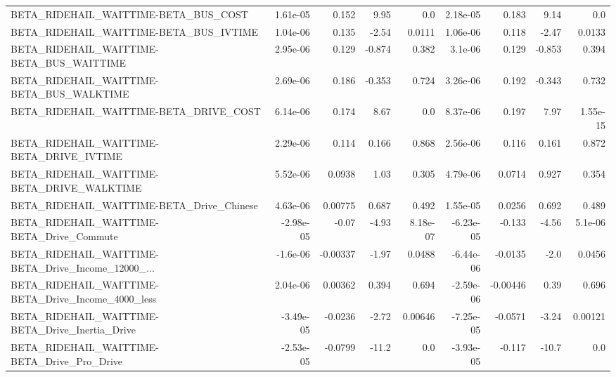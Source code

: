 \begin{tabular}{lrrrrrrrr}
BETA\_RIDEHAIL\_WAITTIME-BETA\_BUS\_COST               &    1.61e-05 &        0.152 &     9.95 &      0.0 &   2.18e-05 &       0.183 &         9.14 &           0.0 \\
BETA\_RIDEHAIL\_WAITTIME-BETA\_BUS\_IVTIME             &    1.04e-06 &        0.135 &    -2.54 &   0.0111 &   1.06e-06 &       0.118 &        -2.47 &        0.0133 \\
BETA\_RIDEHAIL\_WAITTIME-BETA\_BUS\_WAITTIME           &    2.95e-06 &        0.129 &   -0.874 &    0.382 &    3.1e-06 &       0.129 &       -0.853 &         0.394 \\
BETA\_RIDEHAIL\_WAITTIME-BETA\_BUS\_WALKTIME           &    2.69e-06 &        0.186 &   -0.353 &    0.724 &   3.26e-06 &       0.192 &       -0.343 &         0.732 \\
BETA\_RIDEHAIL\_WAITTIME-BETA\_DRIVE\_COST             &    6.14e-06 &        0.174 &     8.67 &      0.0 &   8.37e-06 &       0.197 &         7.97 &      1.55e-15 \\
BETA\_RIDEHAIL\_WAITTIME-BETA\_DRIVE\_IVTIME           &    2.29e-06 &        0.114 &    0.166 &    0.868 &   2.56e-06 &       0.116 &        0.161 &         0.872 \\
BETA\_RIDEHAIL\_WAITTIME-BETA\_DRIVE\_WALKTIME         &    5.52e-06 &       0.0938 &     1.03 &    0.305 &   4.79e-06 &      0.0714 &        0.927 &         0.354 \\
BETA\_RIDEHAIL\_WAITTIME-BETA\_Drive\_Chinese          &    4.63e-06 &      0.00775 &    0.687 &    0.492 &   1.55e-05 &      0.0256 &        0.692 &         0.489 \\
BETA\_RIDEHAIL\_WAITTIME-BETA\_Drive\_Commute          &   -2.98e-05 &        -0.07 &    -4.93 & 8.18e-07 &  -6.23e-05 &      -0.133 &        -4.56 &       5.1e-06 \\
BETA\_RIDEHAIL\_WAITTIME-BETA\_Drive\_Income\_12000\_... &    -1.6e-06 &     -0.00337 &    -1.97 &   0.0488 &  -6.44e-06 &     -0.0135 &         -2.0 &        0.0456 \\
BETA\_RIDEHAIL\_WAITTIME-BETA\_Drive\_Income\_4000\_less &    2.04e-06 &      0.00362 &    0.394 &    0.694 &  -2.59e-06 &    -0.00446 &         0.39 &         0.696 \\
BETA\_RIDEHAIL\_WAITTIME-BETA\_Drive\_Inertia\_Drive    &   -3.49e-05 &      -0.0236 &    -2.72 &  0.00646 &  -7.25e-05 &     -0.0571 &        -3.24 &       0.00121 \\
BETA\_RIDEHAIL\_WAITTIME-BETA\_Drive\_Pro\_Drive        &   -2.53e-05 &      -0.0799 &    -11.2 &      0.0 &  -3.93e-05 &      -0.117 &        -10.7 &           0.0 \\

\end{tabular}
